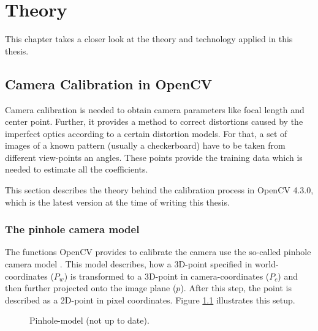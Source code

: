 \chapter{Theory}\label{theory}
This chapter takes a closer look at the theory and technology applied in this thesis.

\section{Camera Calibration in OpenCV}
Camera calibration is needed to obtain camera parameters like focal length and center point.
Further, it provides a method to correct distortions caused by the imperfect optics according to a certain distortion models.
For that, a set of images of a known pattern (usually a checkerboard) have to be taken from different view-points an angles.
These points provide the training data which is needed to estimate all the coefficients.

This section describes the theory behind the calibration process in OpenCV 4.3.0, which is the latest version at the time of writing this thesis.
\subsection{The pinhole camera model}
The functions OpenCV provides to calibrate the camera use the so-called pinhole camera model \cite{cv_calib}.
This model describes, how a 3D-point specified in world-coordinates ($P_w$) is transformed to a 3D-point in camera-coordinates ($P_c$) and then further projected onto the image plane ($p$). After this step, the point is described as a 2D-point in pixel coordinates.  Figure \ref{theory:pin} illustrates this setup.
\begin{figure}[ht]
	\centering
	\caption{Pinhole-model (not up to date).\label{theory:pin}}
\end{figure} 

